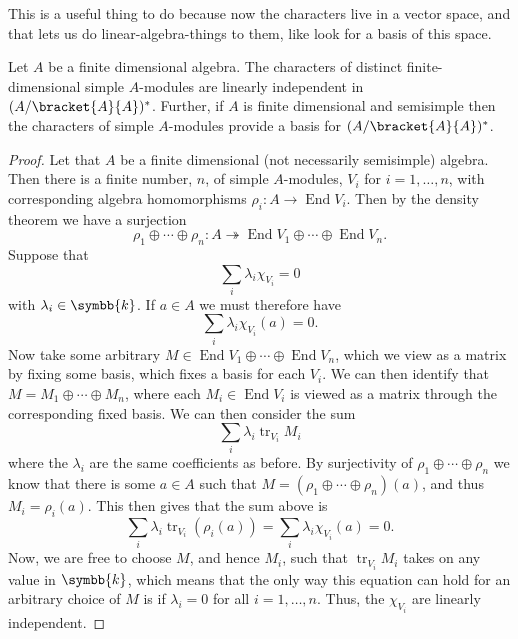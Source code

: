 \documentclass[fleqn]{NotesClass}
\renewcommand{\field}{\symbb{k}}
\DeclareMathOperator{\End}{End}
\DeclareMathOperator{\tr}{tr}
\begin{document}
    This is a useful thing to do because now the characters live in a vector space, and that lets us do linear-algebra-things to them, like look for a basis of this space.
    
    \begin{thm}{}{}
        Let \(A\) be a finite dimensional algebra.
        The characters of distinct finite-dimensional simple \(A\)-modules are linearly independent in \((A/\bracket{A}{A})^*\).
        Further, if \(A\) is finite dimensional and semisimple then the characters of simple \(A\)-modules provide a basis for \((A/\bracket{A}{A})^*\).
        \begin{proof}
            Let that \(A\) be a finite dimensional (not necessarily semisimple) algebra.
            Then there is a finite number, \(n\), of simple \(A\)-modules, \(V_i\) for \(i = 1, \dotsc, n\), with corresponding algebra homomorphisms \(\rho_i \colon A \to \End V_i\).
            Then by the density theorem we have a surjection
            \begin{equation}
                \rho_1 \oplus \dotsb \oplus \rho_n \colon A \twoheadrightarrow \End V_1 \oplus \dotsb \oplus \End V_n.
            \end{equation}
            Suppose that
            \begin{equation}
                \sum_i \lambda_i \chi_{V_i} = 0
            \end{equation}
            with \(\lambda_i \in \field\).
            If \(a \in A\) we must therefore have
            \begin{equation}
                \sum_i \lambda_i \chi_{V_i}(a) = 0.
            \end{equation}
            Now take some arbitrary \(M \in \End V_1 \oplus \dotsb \oplus \End V_n\), which we view as a matrix by fixing some basis, which fixes a basis for each \(V_i\).
            We can then identify that \(M = M_1 \oplus \dotsb \oplus M_n\), where each \(M_i \in \End V_i\) is viewed as a matrix through the corresponding fixed basis.
            We can then consider the sum
            \begin{equation}
                \sum_i \lambda_i \tr_{V_i} M_i
            \end{equation}
            where the \(\lambda_i\) are the same coefficients as before.
            By surjectivity of \(\rho_1 \oplus \dotsb \oplus \rho_n\) we know that there is some \(a \in A\) such that \(M = (\rho_1 \oplus \dotsb \oplus \rho_n)(a)\), and thus \(M_i = \rho_i(a)\).
            This then gives that the sum above is
            \begin{equation}
                \sum_i \lambda_i \tr_{V_i}(\rho_i(a)) = \sum_i \lambda_i \chi_{V_i}(a) = 0.
            \end{equation}
            Now, we are free to choose \(M\), and hence \(M_i\), such that \(\tr_{V_i} M_i\) takes on any value in \(\field\), which means that the only way this equation can hold for an arbitrary choice of \(M\) is if \(\lambda_i = 0\) for all \(i = 1, \dotsc, n\).
            Thus, the \(\chi_{V_i}\) are linearly independent.
            

\end{proof}
\end{thm}
\end{document}
